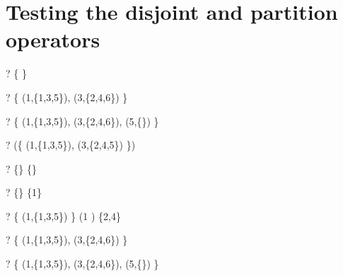 \documentclass{article}
\begin{document}
\section{Testing the disjoint and partition operators}
\begin{zed} \vdash? \disjoint \{ \} \end{zed}
\begin{zed} \vdash? \disjoint \{ (1,\{1,3,5\}), (3,\{2,4,6\}) \} \end{zed}
\begin{zed} \vdash? \disjoint \{ (1,\{1,3,5\}), (3,\{2,4,6\}), (5,\{\}) \} \end{zed}
\begin{zed} \vdash? \lnot (\disjoint \{ (1,\{1,3,5\}), (3,\{2,4,5\}) \}) \end{zed}

\begin{zed} \vdash? \{\} \partition \{\} \end{zed}
\begin{zed} \vdash? \lnot \{\} \partition \{1\} \end{zed}
\begin{zed} \vdash? \{ (1,\{1,3,5\}) \} \partition (1 ) \setminus \{2,4\} \end{zed}
\begin{zed} \vdash? \{ (1,\{1,3,5\}), (3,\{2,4,6\}) \}   \end{zed}
\begin{zed} \vdash? \{ (1,\{1,3,5\}), (3,\{2,4,6\}), (5,\{\}) \}   \end{zed}
\end{document}
